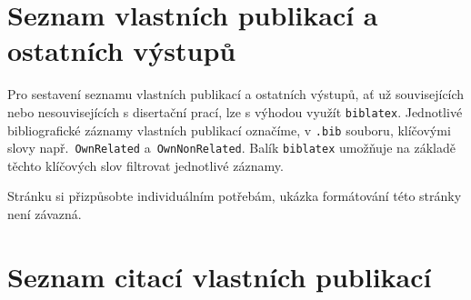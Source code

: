 \chapter*{Seznam vlastních publikací a ostatních výstupů}
\label{sec:ListOfStudentsOwnPublicationActivitiesAndOtherOutcomes}
Pro sestavení seznamu vlastních publikací a ostatních výstupů, ať už souvisejících nebo nesouvisejících s disertační prací, lze s výhodou využít \verb|biblatex|. Jednotlivé bibliografické záznamy vlastních publikací označíme, v \verb|.bib| souboru, klíčovými slovy např.\ \verb|OwnRelated| a~\verb|OwnNonRelated|. Balík \verb|biblatex| umožňuje na základě těchto klíčových slov filtrovat jednotlivé záznamy.

Stránku si přizpůsobte individuálním potřebám, ukázka formátování této stránky není závazná.

\begin{refsection}
\nocite{MyRelatedArticle1, MyRelatedArticle2}
\printbibliography[keyword={OwnRelated}, heading=subbibintoc, title={Publikace a výstupy související s tématem práce}]
\end{refsection}



\chapter*{Seznam citací vlastních publikací}
\label{sec:ListOfCitations}

\endinput